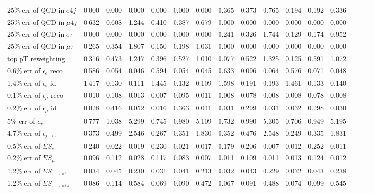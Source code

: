 \begin{sidewaystable}[p]
\begin{tabular}{|l|ccc|ccc|ccc|ccc|ccc|}
  25$\%$ err of QCD in $e 4j$                & 0.000 & 0.000 & 0.000 & 0.000 & 0.000 & 0.000 & 0.365 & 0.373 & 0.765 & 0.194 & 0.192 & 0.336 \\ 
  25$\%$ err of QCD in $\mu 4j$              & 0.632 & 0.608 & 1.244 & 0.410 & 0.387 & 0.679 & 0.000 & 0.000 & 0.000 & 0.000 & 0.000 & 0.000 \\ 
  25$\%$ err of QCD in $e\tau$               & 0.000 & 0.000 & 0.000 & 0.000 & 0.000 & 0.000 & 0.241 & 0.326 & 1.744 & 0.129 & 0.174 & 0.952 \\ 
  25$\%$ err of QCD in $\mu\tau$             & 0.265 & 0.354 & 1.807 & 0.150 & 0.198 & 1.031 & 0.000 & 0.000 & 0.000 & 0.000 & 0.000 & 0.000 \\ 
  top pT reweighting                         & 0.316 & 0.473 & 1.247 & 0.396 & 0.527 & 1.010 & 0.077 & 0.522 & 1.325 & 0.125 & 0.591 & 1.072 \\ 
  0.6$\%$ err of $\epsilon_e$ reco           & 0.586 & 0.054 & 0.046 & 0.594 & 0.054 & 0.045 & 0.633 & 0.096 & 0.064 & 0.576 & 0.071 & 0.048 \\ 
  1.4$\%$ err of $\epsilon_e$ id             & 1.417 & 0.130 & 0.111 & 1.445 & 0.132 & 0.109 & 1.598 & 0.191 & 0.193 & 1.461 & 0.133 & 0.140 \\ 
  0.1$\%$ err of $\epsilon_\mu$ reco         & 0.010 & 0.108 & 0.013 & 0.007 & 0.095 & 0.011 & 0.008 & 0.078 & 0.008 & 0.008 & 0.078 & 0.008 \\ 
  0.2$\%$ err of $\epsilon_\mu$ id           & 0.028 & 0.416 & 0.052 & 0.016 & 0.363 & 0.041 & 0.031 & 0.299 & 0.031 & 0.032 & 0.298 & 0.030 \\ 
  5$\%$ err of $\epsilon_\tau$               & 0.777 & 1.038 & 5.299 & 0.745 & 0.980 & 5.109 & 0.732 & 0.990 & 5.305 & 0.706 & 0.949 & 5.195 \\ 
  4.7$\%$ err of $\epsilon_{j\to\tau}$       & 0.373 & 0.499 & 2.546 & 0.267 & 0.351 & 1.830 & 0.352 & 0.476 & 2.548 & 0.249 & 0.335 & 1.831 \\ 
  0.5$\%$ err of $ES_{e}$                    & 0.240 & 0.022 & 0.019 & 0.230 & 0.021 & 0.017 & 0.179 & 0.206 & 0.007 & 0.012 & 0.252 & 0.011 \\ 
  0.2$\%$ err of $ES_{\mu}$                  & 0.096 & 0.112 & 0.028 & 0.117 & 0.083 & 0.007 & 0.011 & 0.109 & 0.011 & 0.013 & 0.124 & 0.012 \\ 
  1.2$\%$ err of $ES_{\tau\to\pi^\pm}$       & 0.034 & 0.045 & 0.230 & 0.031 & 0.041 & 0.213 & 0.032 & 0.043 & 0.229 & 0.032 & 0.043 & 0.238 \\ 
  1.2$\%$ err of $ES_{\tau\to\pi^\pm\pi^0}$  & 0.086 & 0.114 & 0.584 & 0.069 & 0.090 & 0.472 & 0.067 & 0.091 & 0.488 & 0.074 & 0.099 & 0.545 \\ 

\end{tabular}
\end{sidewaystable}
